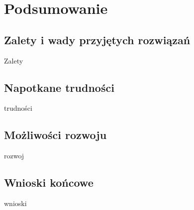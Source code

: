 \documentclass[12pt]{article}
\begin{document}
\begin{sloppypar}
\newpage

\section{Podsumowanie}
{
  \subsection{Zalety i wady przyjętych rozwiązań}
  {
    Zalety
  }
  \subsection{Napotkane trudności}
  {
    trudności
  }
  \subsection{Możliwości rozwoju}
  {
    rozwoj
  }
  \subsection{Wnioski końcowe}
  {
    wnioski
  }
}

\clearpage
\printbibliography[
  heading=bibintoc,
  title={Bibliografia}
]

\clearpage
\listoffigures

\clearpage
\listoftables

\clearpage
{}
\lstlistoflistings

\end{sloppypar}
\end{document}
